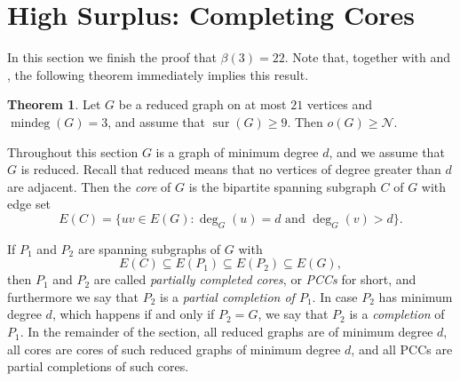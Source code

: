 \documentclass[a4paper,11pt,oneside]{scrartcl}
\theoremstyle{definition}
\newtheorem{theorem}[definition]{Theorem}
\theoremstyle{remark}
\DeclareMathOperator{\mindeg}{mindeg}
\DeclareMathOperator{\sur}{sur}
\newcommand{\pcc}{PCC}
\begin{document}
\section{High Surplus: Completing Cores}\label{section:high_surplus}

In this section we finish the proof that $\beta(3) = 22$. Note that, together with  and , the following theorem immediately implies this result. 

\begin{theorem}\label{theorem:beta_3_for_high_sur}
    Let $G$ be a reduced graph on at most $21$ vertices and $\mindeg(G) = 3$, and assume that $\sur(G) \geq 9$. Then $o(G) \geq \mathcal N$.
\end{theorem}


Throughout this section $G$ is a graph of minimum degree $d$, and we assume that $G$ is reduced. Recall that reduced means that no vertices of degree greater than $d$ are adjacent. Then the \emph{core} of $G$ is the bipartite spanning subgraph $C$ of $G$ with edge set
\[
    E(C) = \{uv \in E(G) : \deg_G(u) = d \text{ and } \deg_G(v) > d\}.
\]

If $P_1$ and $P_2$ are spanning subgraphs of $G$ with
\[
    E(C) \subseteq E(P_1)\subseteq E(P_2)\subseteq E(G),
\]
then $P_1$ and $P_2$ are called \emph{partially completed cores}, or \emph{\pcc s} for short, and furthermore we say that $P_2$ is a \emph{partial completion of $P_1$}. In case $P_2$ has minimum degree $d$, which happens if and only if $P_2 = G$, we say that $P_2$ is a \emph{completion} of $P_1$. In the remainder of the section, all reduced graphs are of minimum degree $d$, all cores are cores of such reduced graphs of minimum degree $d$, and all \pcc s are partial completions of such cores.
\end{document}
